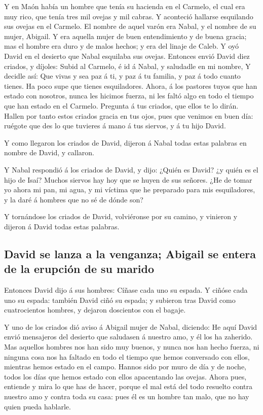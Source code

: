  Y en Maón había un hombre que tenía su hacienda en el
Carmelo, el cual era muy rico, que tenía tres mil ovejas y mil cabras. Y
aconteció hallarse esquilando sus ovejas en el Carmelo.  El
nombre de aquel varón era Nabal, y el nombre de su mujer, Abigail. Y era
aquella mujer de buen entendimiento y de buena gracia; mas el hombre era
duro y de malos hechos; y era del linaje de Caleb.  Y oyó
David en el desierto que Nabal esquilaba sus ovejas. 
Entonces envió David diez criados, y díjoles: Subid al Carmelo, é id á
Nabal, y saludadle en mi nombre,  Y decidle así: Que vivas y
sea paz á ti, y paz á tu familia, y paz á todo cuanto tienes.
 Ha poco supe que tienes esquiladores. Ahora, á los pastores
tuyos que han estado con nosotros, nunca les hicimos fuerza, ni les
faltó algo en todo el tiempo que han estado en el Carmelo. 
Pregunta á tus criados, que ellos te lo dirán. Hallen por tanto estos
criados gracia en tus ojos, pues que venimos en buen día: ruégote que
des lo que tuvieres á mano á tus siervos, y á tu hijo David.

 Y como llegaron los criados de David, dijeron á Nabal todas
estas palabras en nombre de David, y callaron.

 Y Nabal respondió á los criados de David, y dijo: ¿Quién
es David? ¿y quién es el hijo de Isaí? Muchos siervos hay hoy que se
huyen de sus señores.  ¿He de tomar yo ahora mi pan, mi
agua, y mi víctima que he preparado para mis esquiladores, y la daré á
hombres que no sé de dónde son?

 Y tornándose los criados de David, volviéronse por su
camino, y vinieron y dijeron á David todas estas palabras.

\hypertarget{david-se-lanza-a-la-venganza-abigail-se-entera-de-la-erupciuxf3n-de-su-marido}{%
\subsection{David se lanza a la venganza; Abigail se entera de la
erupción de su
marido}\label{david-se-lanza-a-la-venganza-abigail-se-entera-de-la-erupciuxf3n-de-su-marido}}

 Entonces David dijo á sus hombres: Cíñase cada uno su
espada. Y ciñóse cada uno su espada: también David ciñó su espada; y
subieron tras David como cuatrocientos hombres, y dejaron doscientos con
el bagaje.

 Y uno de los criados dió aviso á Abigail mujer de Nabal,
diciendo: He aquí David envió mensajeros del desierto que saludasen á
nuestro amo, y él los ha zaherido.  Mas aquellos hombres
nos han sido muy buenos, y nunca nos han hecho fuerza, ni ninguna cosa
nos ha faltado en todo el tiempo que hemos conversado con ellos,
mientras hemos estado en el campo.  Hannos sido por muro de
día y de noche, todos los días que hemos estado con ellos apacentando
las ovejas.  Ahora pues, entiende y mira lo que has de
hacer, porque el mal está del todo resuelto contra nuestro amo y contra
toda su casa: pues él es un hombre tan malo, que no hay quien pueda
hablarle.

